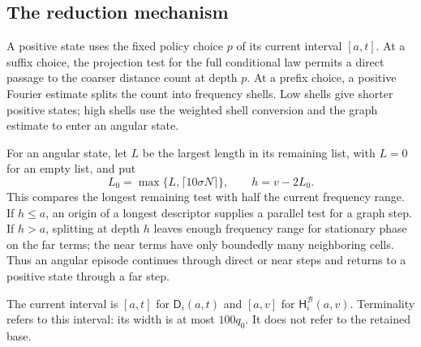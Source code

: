 \subsection{The reduction mechanism}

A positive state uses the fixed policy choice $p$ of its current interval
$[a,t]$.  At a suffix choice, the projection test for the full conditional
law permits a direct passage to the coarser distance count at depth $p$.
At a prefix choice, a positive Fourier estimate splits the count into
frequency shells.  Low shells give shorter positive states; high shells
use the weighted shell conversion and the graph estimate to enter an
angular state.

For an angular state, let $L$ be the largest length in its remaining
list, with $L=0$ for an empty list, and put
\begin{equation}\label{rec:angular-split-depth}
 L_0=\max\{L,\lceil10\sigma N\rceil\},\qquad h=v-2L_0.
\end{equation}
This compares the longest remaining test with half the current frequency
range.  If $h\le a$, an origin of a longest descriptor supplies a parallel
test for a graph step.  If $h>a$, splitting at depth $h$ leaves enough
frequency range for stationary phase on the far terms; the near terms
have only boundedly many neighboring cells.  Thus an angular episode
continues through direct or near steps and returns to a positive state
through a far step.

The current interval is $[a,t]$ for $\mathsf D_i(a,t)$ and $[a,v]$ for
$\mathsf H_i^{\mathcal B}(a,v)$.  Terminality refers to this interval:
its width is at most $100q_0$.  It does not refer to the retained base.

